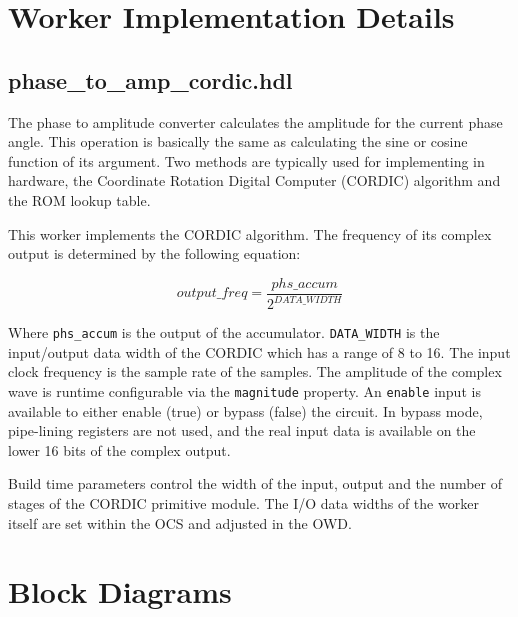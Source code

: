 \documentclass{article}
\def\comp{phase\_to\_amp\_cordic}
\begin{document}
\section*{Worker Implementation Details}
\subsection*{\comp.hdl}
\begin{flushleft}
	The phase to amplitude converter calculates the amplitude for the current phase angle.  This operation is basically the same as calculating the sine or cosine function of its argument.  Two methods are typically used for implementing in hardware, the Coordinate Rotation Digital Computer (CORDIC) algorithm and the ROM lookup table.\medskip

	This worker implements the CORDIC algorithm. The frequency of its complex output is determined by the following equation:

	\begin{equation} \label{eq:output_freq}
		output\_freq = \frac{phs\_accum}{2^{DATA\_WIDTH}}
	\end{equation}

	Where \verb+phs_accum+ is the output of the accumulator. \verb+DATA_WIDTH+ is the input/output data width of the CORDIC which has a range of 8 to 16. The input clock frequency is the sample rate of the samples. The amplitude of the complex wave is runtime configurable via the \verb+magnitude+ property.  An \verb+enable+ input is available to either enable (true) or bypass (false) the circuit. In bypass mode, pipe-lining registers are not used, and the real input data is available on the lower 16 bits of the complex output.\medskip

	Build time parameters control the width of the input, output and the number of stages of the CORDIC primitive module. The I/O data widths of the worker itself are set within the OCS and adjusted in the OWD.
\end{flushleft}

\section*{Block Diagrams}
\end{document}
